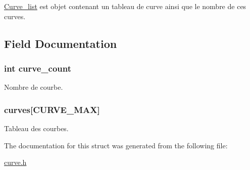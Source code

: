 \hyperlink{struct_curve__list}{Curve\+\_\+list} est objet contenant un tableau de curve ainsi que le nombre de ces curves. 

\subsection{Field Documentation}
\subsubsection[{\texorpdfstring{curve\+\_\+count}{curve_count}}]{\setlength{\rightskip}{0pt plus 5cm}int curve\+\_\+count}\hypertarget{struct_curve__list_a97c088ae642b601e713d2001c718864d}{}\label{struct_curve__list_a97c088ae642b601e713d2001c718864d}
Nombre de courbe. 
\subsubsection[{\texorpdfstring{curves}{curves}}]{ curves\mbox{[}C\+U\+R\+V\+E\+\_\+\+M\+AX\mbox{]}}\hypertarget{struct_curve__list_a55c0ff2f9889340ccae2f1b414a2f482}{}\label{struct_curve__list_a55c0ff2f9889340ccae2f1b414a2f482}
Tableau des courbes. 

The documentation for this struct was generated from the following file\+:\begin{DoxyCompactItemize}
\item 
\hyperlink{curve_8h}{curve.\+h}\end{DoxyCompactItemize}
